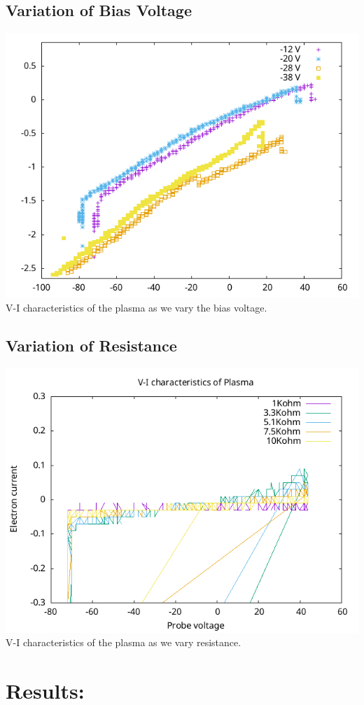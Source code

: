 \documentclass[]{report}[12 pt]
\begin{document}
\subsection*{Variation of Bias Voltage}
\begin{center}
	\includegraphics{variationbias.png}\\
	V-I characteristics of the plasma as we vary the bias voltage.
\end{center}

\subsection*{Variation of Resistance}
\begin{center}
	\includegraphics{variationresistance.png}\\
	V-I characteristics of the plasma as we vary resistance.
\end{center}

\section*{Results:}
\end{document}
